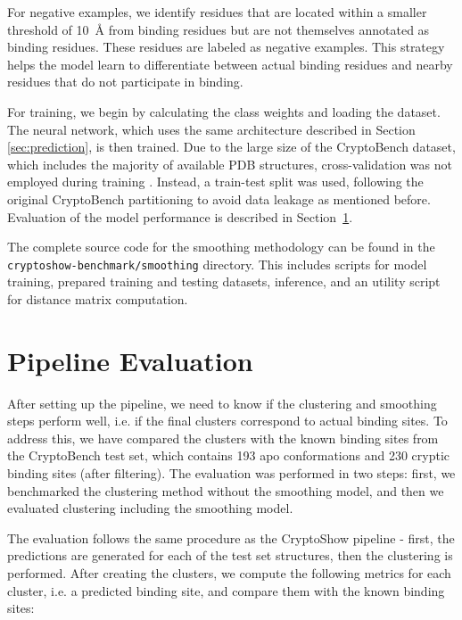 For negative examples, we identify residues that are located within a smaller threshold of 10~\AA{} from binding residues but are not themselves annotated as binding residues. These residues are labeled as negative examples. This strategy helps the model learn to differentiate between actual binding residues and nearby residues that do not participate in binding.

For training, we begin by calculating the class weights and loading the dataset. The neural network, which uses the same architecture described in Section \ref{sec:prediction}, is then trained. Due to the large size of the CryptoBench dataset, which includes the majority of available PDB structures, cross-validation was not employed during training . Instead, a train-test split was used, following the original CryptoBench partitioning to avoid data leakage as mentioned before. Evaluation of the model performance is described in Section~\ref{sec:pipeline-evaluation}.

The complete source code for the smoothing methodology can be found in the \lstinline!cryptoshow-benchmark/smoothing! directory. This includes scripts for model training, prepared training and testing datasets, inference, and an utility script for distance matrix computation.

\section{Pipeline Evaluation}
\label{sec:pipeline-evaluation}

After setting up the pipeline, we need to know if the clustering and smoothing steps perform well, i.e. if the final clusters correspond to actual binding sites. To address this, we have compared the clusters with the known binding sites from the CryptoBench test set, which contains 193 apo conformations and 230 cryptic binding sites (after filtering). The evaluation was performed in two steps: first, we benchmarked the clustering method without the smoothing model, and then we evaluated clustering including the smoothing model.

The evaluation follows the same procedure as the CryptoShow pipeline - first, the predictions are generated for each of the test set structures, then the clustering is performed. After creating the clusters, we compute the following metrics for each cluster, i.e. a predicted binding site, and compare them with the known binding sites:

